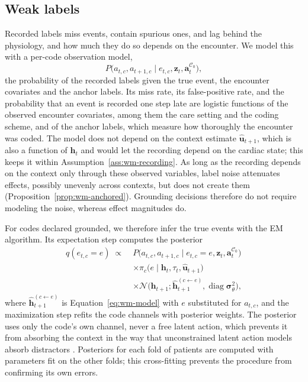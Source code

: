 \subsection{Weak labels}
\label{sec:wm-weak}

Recorded labels miss events, contain spurious ones, and lag behind the physiology, and how much they do so depends on the encounter. We model this with a per-code observation model,
\begin{equation}
\label{eq:wm-obsmodel}
P\big(a_{t,c},a_{t+1,c}\mid e_{t,c},\mathbf{z}_t,\mathbf{a}^{\mathcal{C}_0}_t\big),
\end{equation}
the probability of the recorded labels given the true event, the encounter covariates and the anchor labels. Its miss rate, its false-positive rate, and the probability that an event is recorded one step late are logistic functions of the observed encounter covariates, among them the care setting and the coding scheme, and of the anchor labels, which measure how thoroughly the encounter was coded. The model does not depend on the context estimate $\hat{\mathbf{u}}_{t+1}$, which is also a function of $\mathbf{h}_t$ and would let the recording depend on the cardiac state; this keeps it within Assumption~\ref{ass:wm-recording}. As long as the recording depends on the context only through these observed variables, label noise attenuates effects, possibly unevenly across contexts, but does not create them (Proposition~\ref{prop:wm-anchored}). Grounding decisions therefore do not require modeling the noise, whereas effect magnitudes do.

For codes declared grounded, we therefore infer the true events with the EM algorithm. Its expectation step computes the posterior
\begin{equation}
\label{eq:wm-posterior}
\begin{split}
q(e_{t,c}=e)\;\propto\;{}&P\big(a_{t,c},a_{t+1,c}\mid e_{t,c}=e,\mathbf{z}_t,\mathbf{a}^{\mathcal{C}_0}_t\big)\\
&\times\pi_c\big(e\mid\mathbf{h}_t,\tau_t,\hat{\mathbf{u}}_{t+1}\big)\\
&\times\mathcal{N}\big(\mathbf{h}_{t+1};\hat{\mathbf{h}}^{(c\leftarrow e)}_{t+1},\operatorname{diag}\boldsymbol{\sigma}^{2}_\theta\big),
\end{split}
\end{equation}
where $\hat{\mathbf{h}}^{(c\leftarrow e)}_{t+1}$ is Equation~\eqref{eq:wm-model} with $e$ substituted for $a_{t,c}$, and the maximization step refits the code channels with posterior weights. The posterior uses only the code's own channel, never a free latent action, which prevents it from absorbing the context in the way that unconstrained latent action models absorb distractors \citep{nikulin2025laom}. Posteriors for each fold of patients are computed with parameters fit on the other folds; this cross-fitting \citep{chernozhukov2018dml} prevents the procedure from confirming its own errors.


